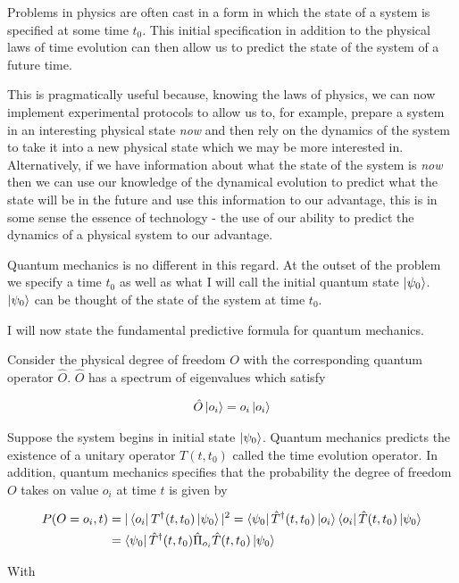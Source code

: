 \documentclass[12pt]{article}
\begin{document}
Problems in physics are often cast in a form in which the state of a system is specified at some time $t_0$. This initial specification in addition to the physical laws of time evolution can then allow us to predict the state of the system of a future time. 

This is pragmatically useful because, knowing the laws of physics, we can now implement experimental protocols to allow us to, for example, prepare a system in an interesting physical state \textit{now} and then rely on the dynamics of the system to take it into a new physical state which we may be more interested in. Alternatively, if we have information about what the state of the system is \textit{now} then we can use our knowledge of the dynamical evolution to predict what the state will be in the future and use this information to our advantage, this is in some sense the essence of technology - the use of our ability to predict the dynamics of a physical system to our advantage.

Quantum mechanics is no different in this regard. At the outset of the problem we specify a time $t_0$ as well as what I will call the initial quantum state $\ket{\psi_0}$. $\ket{\psi_0}$ can be thought of the state of the system at time $t_0$.

I will now state the fundamental predictive formula for quantum mechanics.

Consider the physical degree of freedom $O$ with the corresponding quantum operator $\hat{O}$. $\hat{O}$ has a spectrum of eigenvalues which satisfy

\begin{align}
\hat{O} \ket{o_i} = o_i \ket{o_i}
\end{align}

Suppose the system begins in initial state $\ket{\psi_0}$.
Quantum mechanics predicts the existence of a unitary operator $T(t,t_0)$ called the time evolution operator. In addition, quantum mechanics specifies that the probability the degree of freedom $O$ takes on value $o_i$ at time $t$ is given by

\begin{align}
P(O=o_i,t) &= |\bra{o_i}T^{\dag}(t,t_0)\ket{\psi_0}|^2 = \bra{\psi_0}\hat{T}^{\dag}(t,t_0)\ket{o_i}\bra{o_i}\hat{T}(t,t_0)\ket{\psi_0}\\
&=\bra{\psi_0}\hat{T}^{\dag}(t,t_0)\hat{\Pi}_{o_i} \hat{T}(t,t_0)\ket{\psi_0}\\
\end{align}

With
\end{document}
